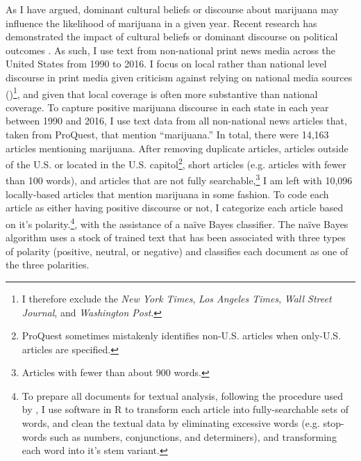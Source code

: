 As I have argued, dominant cultural beliefs or discourse about marijuana may influence the likelihood of marijuana in a given year.  Recent research has demonstrated the impact of cultural beliefs or dominant discourse on political outcomes \citep{bail_2012,mccammon_et_al_2007,ghaziani_and_baldassarri_2011}. As such, I use text from non-national print news media across the United States from 1990 to 2016. I focus on local rather than national level discourse in print media given criticism against relying on national media sources (\citealt{earl_et_al_2004})\footnote{I therefore exclude the \textit{New York Times}, \textit{Los Angeles Times}, \textit{Wall Street Journal}, and \textit{Washington Post}.}, and given that local coverage is often more substantive than national coverage. To capture positive marijuana discourse in each state in each year between 1990 and 2016, I use text data from all non-national news articles that, taken from ProQuest, that mention ``marijuana.'' In total, there were 14,163 articles mentioning marijuana. After removing duplicate articles, articles outside of the U.S. or located in the U.S. capitol\footnote{ProQuest sometimes mistakenly identifies non-U.S. articles when only-U.S. articles are specified.}, short articles (e.g. articles with fewer than 100 words), and articles that are not fully searchable,\footnote{Articles with fewer than about 900 words.} I am left with 10,096 locally-based articles that mention marijuana in some fashion. %
To code each article as either having positive discourse or not, I categorize each article based on it's polarity.\footnote{To prepare all documents for textual analysis, following the procedure used by \citet{bail_2012}, I use software in R to transform each article into fully-searchable sets of words, and clean the textual data by eliminating excessive words (e.g. stop-words such as numbers, conjunctions, and determiners), and transforming each word into it's stem variant.}, with the assistance of a na\"{i}ve Bayes classifier. The na\"{i}ve Bayes algorithm uses a stock of trained text that has been associated with three types of polarity (positive, neutral, or negative) and classifies each document as one of the three polarities. %




